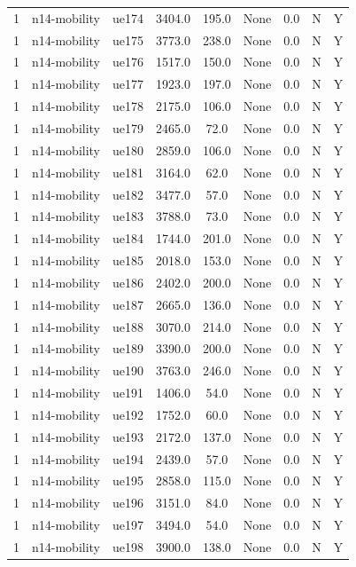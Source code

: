 \begin{table}[ht]
\begin{tabular}{|c|c|c|c|c|c|c|c|c|}
1 & n14-mobility & ue174 & 3404.0 & 195.0 & None & 0.0 & N & Y \\
1 & n14-mobility & ue175 & 3773.0 & 238.0 & None & 0.0 & N & Y \\
1 & n14-mobility & ue176 & 1517.0 & 150.0 & None & 0.0 & N & Y \\
1 & n14-mobility & ue177 & 1923.0 & 197.0 & None & 0.0 & N & Y \\
1 & n14-mobility & ue178 & 2175.0 & 106.0 & None & 0.0 & N & Y \\
1 & n14-mobility & ue179 & 2465.0 & 72.0 & None & 0.0 & N & Y \\
1 & n14-mobility & ue180 & 2859.0 & 106.0 & None & 0.0 & N & Y \\
1 & n14-mobility & ue181 & 3164.0 & 62.0 & None & 0.0 & N & Y \\
1 & n14-mobility & ue182 & 3477.0 & 57.0 & None & 0.0 & N & Y \\
1 & n14-mobility & ue183 & 3788.0 & 73.0 & None & 0.0 & N & Y \\
1 & n14-mobility & ue184 & 1744.0 & 201.0 & None & 0.0 & N & Y \\
1 & n14-mobility & ue185 & 2018.0 & 153.0 & None & 0.0 & N & Y \\
1 & n14-mobility & ue186 & 2402.0 & 200.0 & None & 0.0 & N & Y \\
1 & n14-mobility & ue187 & 2665.0 & 136.0 & None & 0.0 & N & Y \\
1 & n14-mobility & ue188 & 3070.0 & 214.0 & None & 0.0 & N & Y \\
1 & n14-mobility & ue189 & 3390.0 & 200.0 & None & 0.0 & N & Y \\
1 & n14-mobility & ue190 & 3763.0 & 246.0 & None & 0.0 & N & Y \\
1 & n14-mobility & ue191 & 1406.0 & 54.0 & None & 0.0 & N & Y \\
1 & n14-mobility & ue192 & 1752.0 & 60.0 & None & 0.0 & N & Y \\
1 & n14-mobility & ue193 & 2172.0 & 137.0 & None & 0.0 & N & Y \\
1 & n14-mobility & ue194 & 2439.0 & 57.0 & None & 0.0 & N & Y \\
1 & n14-mobility & ue195 & 2858.0 & 115.0 & None & 0.0 & N & Y \\
1 & n14-mobility & ue196 & 3151.0 & 84.0 & None & 0.0 & N & Y \\
1 & n14-mobility & ue197 & 3494.0 & 54.0 & None & 0.0 & N & Y \\
1 & n14-mobility & ue198 & 3900.0 & 138.0 & None & 0.0 & N & Y \\

\end{tabular}
\end{table}
